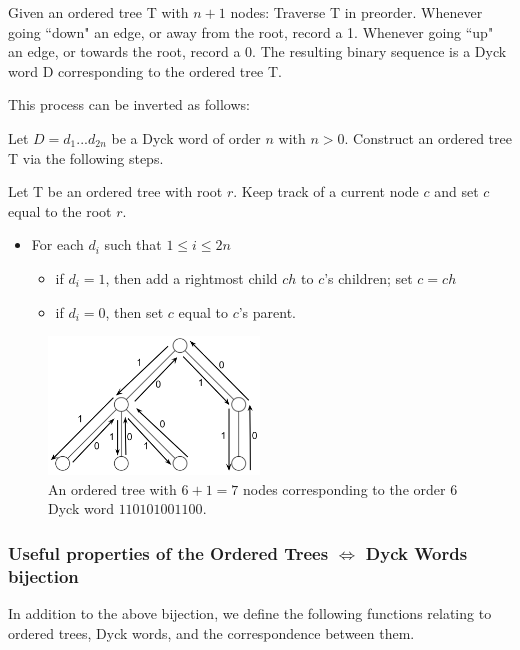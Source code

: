 Given an ordered tree T with $n+1$ nodes: Traverse T in preorder.  Whenever going ``down" an edge, or away from the root, record a 1.  Whenever going ``up" an edge, or towards the root, record a 0.  The resulting binary sequence is a Dyck word D corresponding to the ordered tree T. 

This process can be inverted as follows: 

Let $D=d_1...d_{2n}$ be a Dyck word of order $n$ with $n > 0$. Construct an ordered tree T via the following steps. 

Let T be an ordered tree with root $r$.  Keep track of a current node $c$ and set $c$ equal to the root $r$.

\begin{itemize}
    \item For each $d_i$ such that $1 \le i \le 2n$ 
	\begin{itemize}
	    \item if $d_i=1$, then add a rightmost child $ch$ to $c$'s children; set $c=ch$
	    \item if $d_i=0$, then set $c$ equal to $c$'s parent.
	\end{itemize}

\end{itemize}

\begin{figure}
    \centering
    \includegraphics[width=0.5\textwidth]{otreebij.png}
    \caption{An ordered tree with $6+1=7$ nodes corresponding to the order 6 Dyck word $110101001100$.}
    \label{ordered_tree_bijection_illustration}
\end{figure}

\subsubsection{Useful properties of the Ordered Trees $\iff$ Dyck Words bijection}

In addition to the above bijection, we define the following functions relating to ordered trees, Dyck words, and the correspondence between them.

